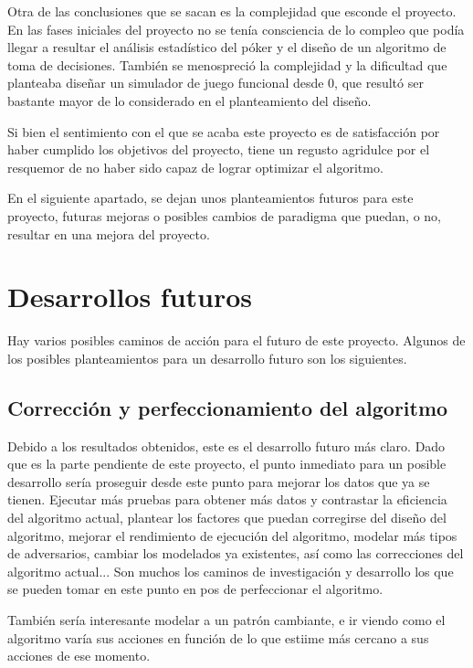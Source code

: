 Otra de las conclusiones que se sacan es la complejidad que esconde el proyecto. En las fases iniciales del proyecto no se tenía consciencia de lo compleo que podía llegar a resultar el análisis estadístico del póker y el diseño de un algoritmo de toma de decisiones. También se menospreció la complejidad y la dificultad que planteaba diseñar un simulador de juego funcional desde 0, que resultó ser bastante mayor de lo considerado en el planteamiento del diseño. 

Si bien el sentimiento con el que se acaba este proyecto es de satisfacción por haber cumplido los objetivos del proyecto, tiene un regusto agridulce por el resquemor de no haber sido capaz de lograr optimizar el algoritmo.

En el siguiente apartado, se dejan unos planteamientos futuros para este proyecto, futuras mejoras o posibles cambios de paradigma que puedan, o no, resultar en una mejora del proyecto.

\section{Desarrollos futuros}

Hay varios posibles caminos de acción para el futuro de este proyecto. Algunos de los posibles planteamientos para un desarrollo futuro son los siguientes.

\subsection{Corrección y perfeccionamiento del algoritmo}

Debido a los resultados obtenidos, este es el desarrollo futuro más claro. Dado que es la parte pendiente de este proyecto, el punto inmediato para un posible desarrollo sería proseguir desde este punto para mejorar los datos que ya se tienen. Ejecutar más pruebas para obtener más datos y contrastar la eficiencia del algoritmo actual, plantear los factores que puedan corregirse del diseño del algoritmo, mejorar el rendimiento de ejecución del algoritmo, modelar más tipos de adversarios, cambiar los modelados ya existentes, así como las correcciones del algoritmo actual... Son muchos los caminos de investigación y desarrollo los que se pueden tomar en este punto en pos de perfeccionar el algoritmo.

También sería interesante modelar a un patrón cambiante, e ir viendo como el algoritmo varía sus acciones en función de lo que estiime más cercano a sus acciones de ese momento.

